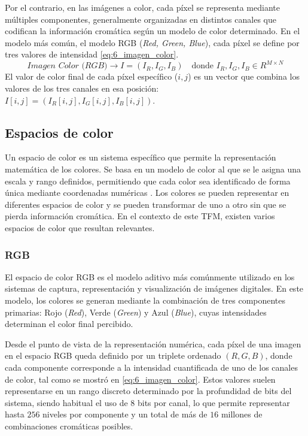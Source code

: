 Por el contrario, en las imágenes a color, cada píxel se 
representa mediante múltiples componentes, generalmente organizadas en distintos canales que 
codifican la información cromática según un modelo de color determinado. En el modelo más común,
el modelo RGB (\textit{Red, Green, Blue}), cada píxel se define por tres valores de intensidad \eqref{eq:6_imagen_color}.
\begin{equation}
    \textit{Imagen Color (RGB)} \rightarrow I = (I_R, I_G, I_B) \quad \text{donde } I_R, I_G, I_B \in R^{M \times N}
    \label{eq:6_imagen_color}
\end{equation}
El valor de color final de cada píxel específico ($i, j$) es un vector que combina los valores 
de los tres canales en esa posición: $I[i, j] = (I_R[i, j], I_G[i, j], I_B[i, j])$.

\newpage

\subsection{Espacios de color} \label{subsubsec:3_3_espacios_color}
Un espacio de color es un sistema específico que permite la representación matemática de 
los colores. Se basa en un modelo de color al que se le asigna una escala y rango definidos,
permitiendo que cada color sea identificado de forma única mediante coordenadas numéricas \cite{color_spaces}.
Los colores se pueden representar en diferentes espacios de color y se pueden transformar 
de uno a otro sin que se pierda información cromática. En el contexto de este TFM, 
existen varios espacios de color que resultan relevantes.

\subsubsection{RGB} \label{subsubsubsec:3_3_1_rgb}
El espacio de color RGB es el modelo aditivo más comúnmente utilizado en los sistemas de captura,
representación y visualización de imágenes digitales. En este modelo, los colores se generan 
mediante la combinación de tres componentes primarias: Rojo (\textit{Red}), Verde (\textit{Green}) y Azul (\textit{Blue}),
cuyas intensidades determinan el color final percibido.

Desde el punto de vista de la representación numérica, cada píxel de una imagen en el espacio
RGB queda definido por un triplete ordenado $(R, G, B)$, donde cada componente corresponde a la
intensidad cuantificada de uno de los canales de color, tal como se mostró en \eqref{eq:6_imagen_color}. 
Estos valores suelen representarse en un rango discreto determinado por la profundidad de 
bits del sistema, siendo habitual el uso de 8 bits por canal, lo que permite representar 
hasta $256$ niveles por componente y un total de más de $16$ millones de combinaciones cromáticas posibles.

